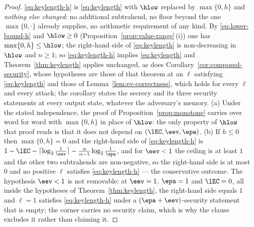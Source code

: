 \begin{proof}
\eqref{eq:keylength-h} is \eqref{eq:keylength} with $\hlow$ replaced by
$\max\{0,h\}$ and \emph{nothing else changed}: no additional subtrahend,
no floor beyond the one $\max\{0,\cdot\}$ already supplies, no arithmetic
requirement of any kind. By \eqref{eq:lower-bound-h} and $\hlow\ge0$
(Proposition~\ref{prop:value-range}\,(i)) one has
$\max\{0,h\}\le\hlow$; the right-hand side of \eqref{eq:keylength} is
non-decreasing in $\hlow$ and $n\ge1$; so \eqref{eq:keylength-h} implies
\eqref{eq:keylength} and Theorem~\ref{thm:keylength} applies unchanged, as
does Corollary~\ref{cor:composed-security}, whose hypotheses are those of
that theorem at an $\ell$ satisfying \eqref{eq:keylength} and those of
Lemma~\ref{lem:ev-correctness}, which holds for every $\ell$ and every
attack; the corollary states the secrecy and its three security statements at
every output state, whatever the adversary's memory.
(a) Under the stated independence, the proof of
Proposition~\ref{prop:monotone} carries over word for word with
$\max\{0,h\}$ in place of $\hlow$: the only property of $\hlow$ that proof
reads is that it does not depend on $(\lEC,\eev,\epa)$. (b) If $h\le0$ then
$\max\{0,h\}=0$ and the right-hand side of \eqref{eq:keylength-h} is
$1-\lEC-\lceil\log_2\frac1{\eev}\rceil-\frac{\alpha}{\alpha-1}\log_2\frac1{\epa}$,
and for $\eev<1$ the ceiling is at least $1$ and the other two subtrahends
are non-negative, so the right-hand side is at most $0$ and no positive
$\ell$ satisfies \eqref{eq:keylength-h} --- the conservative outcome. The
hypothesis $\eev<1$ is not removable: at $\eev=1$, $\epa=1$ and $\lEC=0$,
all inside the hypotheses of Theorem~\ref{thm:keylength}, the right-hand
side equals $1$ and $\ell=1$ satisfies \eqref{eq:keylength-h} under a
$(\epa+\eev)$-security statement that is empty; the corner carries no
security claim, which is why the clause excludes it rather than claiming
it.
\end{proof}
